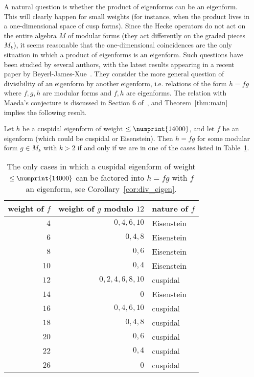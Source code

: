 \documentclass{book}
\newcommand{\bound}{\numprint{14000}}
\begin{document}
A natural question is whether the product of eigenforms can be an eigenform.
This will clearly happen for small weights (for instance, when the product
lives in a one-dimensional space of cusp forms).  Since the Hecke operators
do not act on the entire algebra $M$ of modular forms (they act
differently on the graded pieces $M_k$), it seems reasonable that the
one-dimensional coincidences are the only situation in which a product of
eigenforms is an eigenform.  Such questions have been studied by several
authors, with the latest results appearing in a recent paper by
Beyerl-James-Xue~\cite{BeyerlJamesXue}.  They consider the more general question
of divisibility of an
eigenform by another eigenform, i.e. relations of the form $h=fg$ where
$f,g,h$ are modular forms and $f,h$ are eigenforms.  The relation with Maeda's 
conjecture is discussed in Section 6 of~\cite{BeyerlJamesXue}, and 
Theorem~\ref{thm:main} implies the following result.

\begin{corollary}
  \label{cor:div_eigen}
  Let $h$ be a cuspidal eigenform of weight $\leq\bound$, and let 
  $f$ be an eigenform
  (which could be cuspidal or Eisenstein).  Then $h=fg$ for some modular form
  $g\in M_k$ with $k>2$ if and only if we are in one of the cases listed in 
  Table~\ref{tbl:div_eigen}.
\end{corollary}

\begin{table}[h]
  \begin{center}
  \begin{tabular}{r|r|l}
    weight of $f$ & weight of $g$ modulo $12$ & nature of $f$ \\ \hline
    $4$ & $0,4,6,10$ & Eisenstein \\
    $6$ & $0,4,8$ & Eisenstein \\
    $8$ & $0,6$ & Eisenstein \\
    $10$ & $0,4$ & Eisenstein \\
    $12$ & $0,2,4,6,8,10$ & cuspidal\\
    $14$ & $0$ & Eisenstein \\
    $16$ & $0,4,6,10$ & cuspidal\\
    $18$ & $0,4,8$ & cuspidal\\
    $20$ & $0,6$ & cuspidal\\
    $22$ & $0,4$ & cuspidal\\
    $26$ & $0$ & cuspidal
  \end{tabular}
\end{center}
  \caption{The only cases in which a cuspidal eigenform of weight $\leq\bound$
  can be factored into $h=fg$ with $f$ an eigenform, see
  Corollary~\ref{cor:div_eigen}.}
  \label{tbl:div_eigen}
\end{table}
\end{document}
